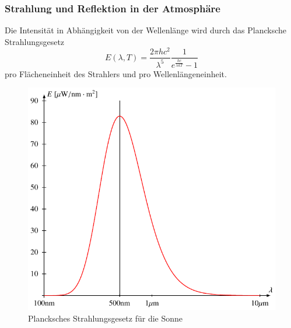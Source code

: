 \subsubsection{Strahlung und Reflektion in der Atmosphäre}
Die Intensität in Abhängigkeit von der Wellenlänge wird durch das Plancksche
Strahlungsgesetz
\begin{equation}
E(\lambda,T)
=
\frac{2\pi hc^2}{\lambda^5}\frac{1}{e^{\frac{hc}{\lambda kT}}-1}
\end{equation}
pro Flächeneinheit des Strahlers und pro Wellenlängeneinheit.
\begin{figure}
\centering
\includegraphics{chapters/1/planck.pdf}
\caption{Plancksches Strahlungsgesetz für die Sonne
\label{skript:planck-kurve}}
\end{figure}

